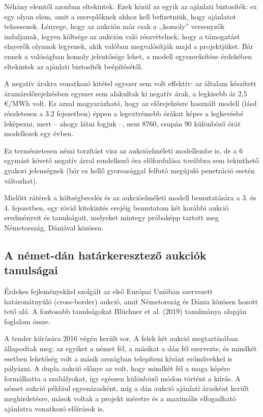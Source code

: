 \documentclass[twoside, magyar, showtrims]{corvinusphd}
\theoremstyle{plain}
\theoremstyle{remark}
\theoremstyle{definition}
\begin{document}
Néhány elemtől azonban eltekintek. Ezek közül az egyik
az ajánlati biztosíték: ez egy olyan elem, amit
a szereplőknek ahhoz kell befizetniük,
hogy ajánlatot tehessenek. Lényege, hogy
az aukción már csak a ,,komoly'' versenyzők induljanak,
legyen költsége az aukción való részvételnek, hogy
a támogatást elnyerők olyanok legyenek,
akik valóban megvalósítják majd a projektjüket.
Bár ennek a valóságban komoly jelentősége lehet, a modell egyszerűsítése
érdekében eltekintek az ajánlati biztosíték beépítésétől.

A negatív árakra vonatkozó kitétel egyszer
sem volt effektív: az általam készített áramárelőrejelzésben
egyszer sem alakultak ki negatív árak,
a legkisebb ár 2,5 €/MWh volt. Ez azzal magyarázható,
hogy az előrejelzésre használt modell
(lásd részletesen a 3.2 fejezetben) éppen a legextrémebb órákat
képes a legkevésbé leképezni, mert -- ahogy látni fogjuk --,
nem 8760, csupán 90 különböző órát modellezek egy évben.

Ez természetesen némi torzítást visz
az aukcióelméleti modellembe is, de a 6 egymást
követő negatív árral rendelkező óra előfordulása továbbra sem
tekinthető gyakori jelenségnek (bár ez kellő
gyorsasággal felfutó megújuló penetráció esetén változhat).

Mielőtt rátérek a költségbecslés és az aukcióelméleti
modell bemutatására a 3. és 4. fejezetben, egy rövid kitekintés 
erejéig bemutatom két korábbi aukció
eredményeit és tanulságait, melyeket mintegy próbaképp tartott
meg Németország, Dániával közösen.

\subsection{A német-dán határkeresztező aukciók tanulságai}

Érdekes fejleményekkel szolgált az első Európai Unióban
szervezett határonátnyúló (cross-border) aukció,
amit Németország és Dánia közösen hozott tető alá.
A fontosabb tanulságokat Blüchner et al. (2019)
tanulmánya alapján foglalom össze.

A tender kiírására 2016 végén került sor.
A felek két aukció megtartásában állapodtak meg: az egyiket a német fél,
a másikat a dán fél szervezte, és mindkét esetben lehetőség volt
a másik országban telepíteni kívánt erőművekkel is pályázni.
A dupla aukció előnye az volt, hogy mindkét fél a maga képére
formálhatta a szabályokat, így egészen különböző módon történt
a kiírás. A német aukció például egyenárasként, míg a dán aukció ajánlati árasként
került meghirdetésre, mások voltak a projekt méretre és a 
maximális elfogadható ajánlatra vonatkozó előírások is.
\end{document}
